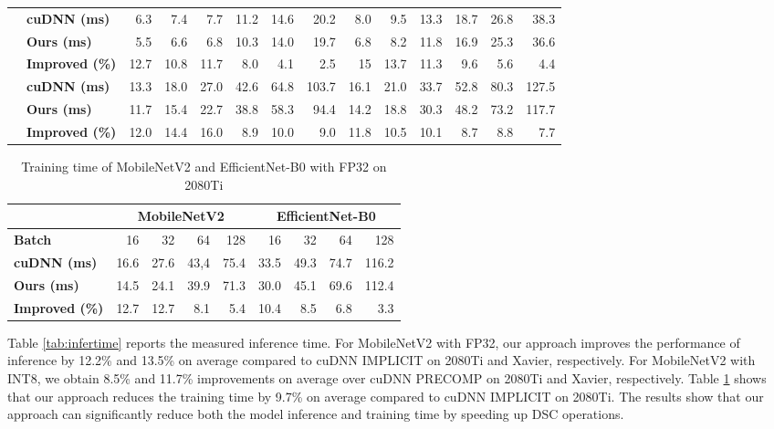 \begin{table}[]
\begin{threeparttable}
\begin{tabular}{c|l|rrrrrr|rrrrrr}
    &\textbf{cuDNN (ms)}   &6.3  &7.4  &7.7  &11.2 &14.6 &20.2&8.0&9.5&13.3&18.7&26.8&38.3 \\
    &\textbf{Ours (ms)}    &5.5  &6.6  &6.8  &10.3 &14.0 &19.7&6.8&8.2&11.8&16.9&25.3&36.6\\
    &\textbf{Improved (\%)} &12.7 &10.8 &11.7 &8.0  &4.1  &2.5&15&13.7&11.3&9.6&5.6&4.4 \\
    \hline
    &\textbf{cuDNN (ms)}   &13.3 &18.0 &27.0 &42.6 &64.8 &103.7&16.1&21.0&33.7&52.8&80.3&127.5  \\
    &\textbf{Ours (ms)}    &11.7 &15.4 &22.7 &38.8 &58.3 &94.4&14.2&18.8&30.3&48.2&73.2&117.7 \\
    &\textbf{Improved (\%)} &12.0 &14.4 &16.0 &8.9 &10.0  &9.0&11.8&10.5&10.1&8.7&8.8&7.7 \\


    \bottomrule
    \end{tabular}
    \footnotesize
    \end{threeparttable}

\end{table}

\begin{table}[]
\setlength{\tabcolsep}{4.4pt}
    \caption{Training time of MobileNetV2 and EfficientNet-B0 with FP32 on 2080Ti}
    \vspace{-3mm}
    \label{tab:traintime}
    \centering
    \begin{threeparttable}
    \begin{tabular}{l|rrrr|rrrr}
    \toprule
    &\multicolumn{4}{c|}{MobileNetV2} & \multicolumn{4}{c}{EfficientNet-B0}\\
    \midrule
    \textbf{Batch} & 16& 32 &64 & 128& 16& 32 &64 & 128\\
    \midrule
    \textbf{cuDNN (ms)} & 16.6 & 27.6 & 43,4 &75.4& 33.5 & 49.3 & 74.7 &116.2 \\
    \textbf{Ours (ms)} & 14.5  &24.1 &39.9 &71.3& 30.0  &45.1 &69.6 &112.4\\
    \textbf{Improved (\%)} &12.7  &12.7 &8.1 &5.4 &10.4  &8.5 &6.8 &3.3\\
    \bottomrule
    \end{tabular}
    \footnotesize
    \end{threeparttable}
    \vspace{-5mm}
\end{table}

Table \ref{tab:infertime} reports the measured inference time. For MobileNetV2 with FP32, our approach improves the performance of
inference by 12.2\% and 13.5\% on average compared to cuDNN IMPLICIT on 2080Ti and Xavier, respectively. For MobileNetV2 with INT8, we
obtain 8.5\% and 11.7\% improvements on average over cuDNN PRECOMP on 2080Ti and Xavier, respectively. Table \ref{tab:traintime} shows that
our approach reduces the training time by 9.7\% on average compared to cuDNN IMPLICIT on 2080Ti. The results show that our approach can
significantly reduce both the model inference and training time by speeding up DSC operations.
